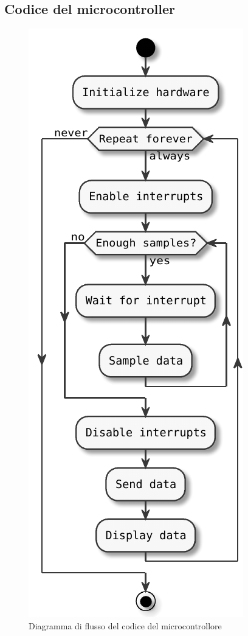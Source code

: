 \documentclass[a4paper, 10pt]{report}
\begin{document}
{        \subsection*{Codice del microcontroller}
        \begin{figure}[H] \centering
            \includegraphics{figures/uml/embedded-flowchart}
            \caption{Diagramma di flusso del codice del microcontrollore}
        \end{figure}

}
\end{document}
